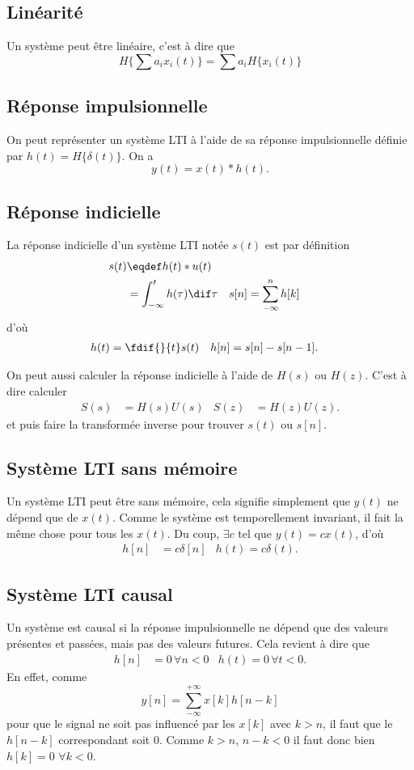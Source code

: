 \subsection{Linéarité}
Un système peut être linéaire, c'est à dire que
\[ H\{\sum a_ix_i(t)\} = \sum a_iH\{x_i(t)\} \]

\subsection{Réponse impulsionnelle}
On peut représenter un système LTI à l'aide de sa réponse impulsionnelle
définie par $h(t) = H\{\delta(t)\}$. On a
\[ y(t) = x(t) * h(t). \]

\subsection{Réponse indicielle}
La réponse indicielle d'un système LTI notée $s(t)$ est par définition
\begin{align*}
  s(t) & \eqdef h(t) * u(t)\\
  & = \int_{-\infty}^t h(\tau) \dif \tau &
  s[n] & = \sum_{-\infty}^n h[k]
\end{align*}
d'où
\begin{align*}
  h(t) & = \fdif{}{t}s(t) & h[n] & = s[n] - s[n-1].
\end{align*}

On peut aussi calculer la réponse indicielle à l'aide de $H(s)$
ou $H(z)$.
C'est à dire calculer
\begin{align*}
  S(s) & = H(s)U(s) & S(z) & = H(z)U(z).
\end{align*}
et puis faire la transformée inverse pour trouver $s(t)$ ou $s[n]$.


\subsection{Système LTI sans mémoire}
Un système LTI peut être sans mémoire,
cela signifie simplement que $y(t)$ ne dépend que de $x(t)$.
Comme le système est temporellement invariant,
il fait la même chose pour tous les $x(t)$.
Du coup, $\exists c$ tel que $y(t) = cx(t)$, d'où
\begin{align*}
  h[n] & = c \delta[n] & h(t) = c \delta(t).
\end{align*}

\subsection{Système LTI causal}
Un système est causal si la réponse impulsionnelle ne dépend
que des valeurs présentes et passées, mais pas des valeurs futures.
Cela revient à dire que
\begin{align*}
  h[n] & = 0 \, \forall n < 0  & h(t) = 0 \, \forall t < 0.
\end{align*}
En effet, comme
\[ y[n] = \sum_{-\infty}^{+\infty}x[k]h[n-k] \]
pour que le signal ne soit pas influencé par les $x[k]$ avec
$k > n$, il faut que le $h[n-k]$ correspondant soit 0.
Comme $k > n$, $n - k < 0$ il faut donc bien $h[k] = 0$ $\forall k < 0$.


